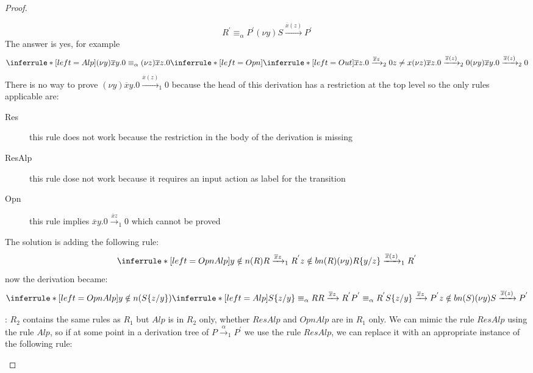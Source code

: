 \begin{theorem}
\begin{proof}
\begin{description}
\begin{description}
\[{		  R^{'} \equiv_{\alpha} P^{'}
	      }{
		(\nu y) S \xrightarrow{\overline{x}(z)} P^{'}
	      }
	    \]
	    The answer is yes, for example
	    \[
	      \inferrule* [left=Alp]{
		  (\nu y) \overline{x}y.0 \equiv_{\alpha} (\nu z) \overline{x}z.0
		\\
		  \inferrule* [left=Opn]{
		      \inferrule* [left=Out]{
		      }{
			\overline{x}z.0 \xrightarrow{\overline{x}z}_{2} 0
		      }
		    \\
		      z\neq x
		  }{
		    (\nu z) \overline{x}z.0 \xrightarrow{\overline{x}(z)}_{2} 0
		  }
	      }{
		(\nu y) \overline{x}y.0 \xrightarrow{\overline{x}(z)}_{2} 0
	      }
	    \]
	    There is no way to prove $(\nu y) \overline{x}y.0 \xrightarrow{\overline{x}(z)}_{1} 0$ because the head of this derivation has a restriction at the top level so the only rules applicable are:
	    \begin{description}
	      \item[Res]
		this rule does not work because the restriction in the body of the derivation is missing
	      \item[ResAlp]
		this rule dose not work because it requires an input action as label for the transition
	      \item[Opn]
		this rule implies $\overline{x}y.0 \xrightarrow{\overline{x}z}_{1} 0$ which cannot be proved
	    \end{description}
	    The solution is adding the following rule:
	    \[
	      \inferrule* [left=OpnAlp]{
		  y\notin n(R)
		\\
		  R\xrightarrow{\overline{x}z}_{1}R^{'}
		\\
		  z\notin bn(R)
	      }{
		(\nu y)R\{y/z\}\xrightarrow{\overline{x}(z)}_{1}R^{'}
	      }
	    \]
	    now the derivation became:
	    \[
	      \inferrule* [left=OpnAlp]{
		  y\notin n(S\{z/y\})
		\\
		  \inferrule* [left=Alp]{
		      S\{z/y\} \equiv_{\alpha} R
		    \\
		      R \xrightarrow{\overline{x}z} R^{'}
		    \\
		      P^{'} \equiv_{\alpha} R^{'}
		  }{
		    S\{z/y\} \xrightarrow{\overline{x}z} P^{'}
		  }
		\\
		  z\notin bn(S)
	      }{
		(\nu y) S \xrightarrow{\overline{x}(z)} P^{'}
	      }
	    \]
	\end{description}
      \item[$\Rightarrow$]:
	$R_{2}$ contains the same rules as $R_{1}$ but $Alp$ is in $R_{2}$ only, whether $ResAlp$ and $OpnAlp$ are in $R_{1}$ only. We can mimic the rule $ResAlp$ using the rule $Alp$, so if at some point in a derivation tree of $P\xrightarrow{\alpha}_{1}P^{'}$ we use the rule $ResAlp$, we can replace it with an appropriate instance of the following rule: 

\end{description}
\end{proof}
\end{theorem}
